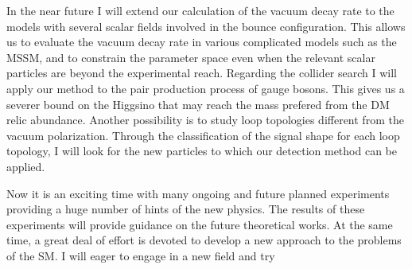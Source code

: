 \documentclass[12pt,notitlepage]{book}
\begin{document}
In the near future I will extend our calculation of the vacuum decay rate to the models with several scalar fields involved in the bounce configuration.
This allows us to evaluate the vacuum decay rate in various complicated models such as the MSSM, and to constrain the parameter space even when the relevant scalar particles are beyond the experimental reach.
Regarding the collider search I will apply our method to the pair production process of gauge bosons.
This gives us a severer bound on the Higgsino that may reach the mass prefered from the DM relic abundance.
Another possibility is to study loop topologies different from the vacuum polarization.
Through the classification of the signal shape for each loop topology, I will look for the new particles to which our detection method can be applied.

Now it is an exciting time with many ongoing and future planned experiments providing a huge number of hints of the new physics.
The results of these experiments will provide guidance on the future theoretical works.
At the same time, a great deal of effort is devoted to develop a new approach to the problems of the SM.
I will eager to engage in a new field and try
\end{document}
